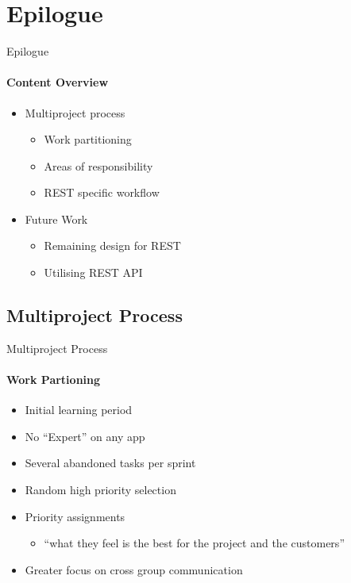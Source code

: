 \section{Epilogue}
    \begin{frame}[t]{Epilogue}\framesubtitle{Content Overview}
        \begin{itemize}
            \item Multiproject process
            \begin{itemize}
                \item Work partitioning
                \item Areas of responsibility
                \item REST specific workflow
            \end{itemize}
            \item Future Work
            \begin{itemize}
                \item Remaining design for REST
                \item Utilising REST API
            \end{itemize}
        \end{itemize}
    \end{frame}

    \subsection{Multiproject Process}
    \begin{frame}[t]{Multiproject Process}\framesubtitle{Work Partioning}  
        \begin{itemize}
            \item Initial learning period
            \item No ``Expert'' on any app
            \item Several abandoned tasks per sprint
            \item Random high priority selection
            \item Priority assignments
            \begin{itemize}
                \item ``what they feel is the best for the project and the customers''
            \end{itemize}
            \item Greater focus on cross group communication
        \end{itemize}
    \end{frame}

